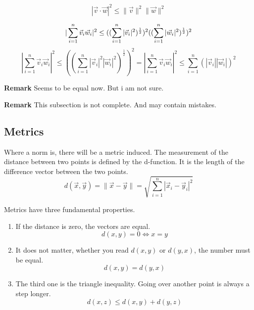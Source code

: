 \documentclass[a4paper]{article}
\begin{document}
\begin{displaymath}
    |\vec{v}\cdot\vec{w}|^{2} \leq \|\vec{v}\|^{2}\|\vec{w}\|^{2}
\end{displaymath}



\begin{displaymath}
    |\sum_{i=1}^{n}\vec{v}_{i}\vec{w}_{i}|^{2} \leq ((\sum_{i=1}^{n}|\vec{v}_{i}|^{2})^{\frac{1}{2}})^{2}((\sum_{i=1}^{n}|\vec{w}_{i}|^{2})^{\frac{1}{2}})^{2}\\
\end{displaymath}
\begin{displaymath}
|\sum_{i=1}^{n}\vec{v}_{i}\vec{w}_{i}|^{2} \leq ((\sum_{i=1}^{n}|\vec{v}_{i}|^{2}|\vec{w}_{i}|^{2})^{\frac{1}{2}})^{2} 
=
|\sum_{i=1}^{n}\vec{v}_{i}\vec{w}_{i}|^{2} \leq \sum_{i=1}^{n}(|\vec{v}_{i}||\vec{w}_{i}|)^{2}
\end{displaymath}

\textbf{Remark} Seems to be equal now. But i am not sure.

\textbf{Remark} This subsection is not complete. And may contain mistakes.

\subsection{Metrics}

Where a norm is, there will be a metric induced.
The measurement of the distance between two points is defined by the d-function. It is the length of the difference vector between the two points.\\
\begin{displaymath}
    d(\vec{x}, \vec{y}) = \|\vec{x}-\vec{y}\| = \sqrt{\sum_{i=1}^{n}|\vec{x}_{i}-\vec{y}_{i}|^2}
\end{displaymath}

Metrics have three fundamental properties.
\begin{enumerate}
\item If the distance is zero, the vectors are equal.
\begin{displaymath}
d(x,y) = 0 \iff x = y
\end{displaymath}
\item It does not matter, whether you read $d(x,y)$ or $d(y,x)$, the number must be equal.
\begin{displaymath}
d(x,y) = d(y,x)
\end{displaymath}
\item The third one is the triangle inequality. Going over another point is always a step longer.
\begin{displaymath}
d(x,z) \leq d(x,y) + d(y,z) 
\end{displaymath}
\end{enumerate}
\end{document}
